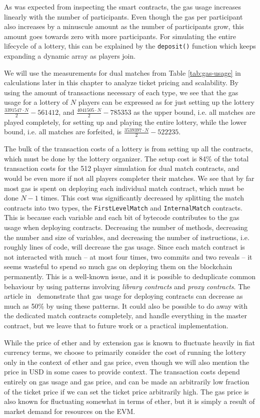 As was expected from inspecting the smart contracts, the gas usage increases linearly with the number of participants. Even though the gas per participant also increases by a minuscule amount as the number of participants grow, this amount goes towards zero with more participants. For simulating the entire lifecycle of a lottery, this can be explained by the \texttt{deposit()} function which keeps expanding a dynamic array as players join. 

We will use the measurements for dual matches from Table \ref{tab:gas-usage} in calculations later in this chapter to analyze ticket pricing and scalability. By using the amount of transactions necessary of each type, we see that the gas usage for a lottery of $N$ players can be expressed as for just setting up the lottery $\frac{3391547 \cdot N}{2} - 561412$, and $\frac{4041505 \cdot N}{2} - 785353$ as the upper bound, i.e. all matches are played completely, for setting up and playing the entire lottery, while the lower bound, i.e. all matches are forfeited, is $\frac{3539397 \cdot N}{2} - 522235$.

The bulk of the transaction costs of a lottery is from setting up all the contracts, which must be done by the lottery organizer. The setup cost is 84\% of the total transaction costs for the 512 player simulation for dual match contracts, and would be even more if not all players completer their matches. We see that by far most gas is spent on deploying each individual match contract, which must be done $N-1$ times. This cost was significantly decreased by splitting the match contracts into two types, the \texttt{FirstLevelMatch} and \texttt{InternalMatch} contracts. This is because each variable and each bit of bytecode contributes to the gas usage when deploying contracts. Decreasing the number of methods, decreasing the number and size of variables, and decreasing the number of instructions, i.e. roughly lines of code, will decrease the gas usage. Since each match contract is not interacted with much – at most four times, two commits and two reveals – it seems wasteful to spend so much gas on deploying them on the blockchain permanently. This is a well-known issue, and it is possible to deduplicate common behaviour by using patterns involving \emph{library contracts} and \emph{proxy contracts}. The article in~\cite{lu_solidity_2018} demonstrate that gas usage for deploying contracts can decrease as much as 50\% by using these patterns. It could also be possible to do away with the dedicated match contracts completely, and handle everything in the master contract, but we leave that to future work or a practical implementation.

While the price of ether and by extension gas is known to fluctuate heavily in fiat currency terms, we choose to primarily consider the cost of running the lottery only in the context of ether and gas price, even though we will also mention the price in USD in some cases to provide context. The transaction costs depend entirely on gas usage and gas price, and can be made an arbitrarily low fraction of the ticket price if we can set the ticket price arbitrarily high. The gas price is also known for fluctuating somewhat in terms of ether, but it is simply a result of market demand for resources on the EVM.
